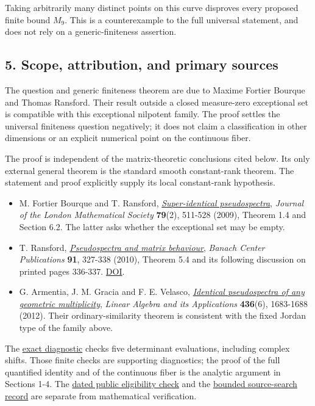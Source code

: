 \documentclass[10pt,a4paper]{article}
\providecommand{\tightlist}{\setlength{\itemsep}{0pt}\setlength{\parskip}{0pt}}
\begin{document}
Taking arbitrarily many distinct points on this curve disproves every
proposed finite bound \(M_9\). This is a counterexample to the full
universal statement, and does not rely on a generic-finiteness
assertion.

\subsection{5. Scope, attribution, and primary
sources}\label{scope-attribution-and-primary-sources}

The question and generic finiteness theorem are due to Maxime Fortier
Bourque and Thomas Ransford. Their result outside a closed measure-zero
exceptional set is compatible with this exceptional nilpotent family.
The proof settles the universal finiteness question negatively; it does
not claim a classification in other dimensions or an explicit numerical
point on the continuous fiber.

The proof is independent of the matrix-theoretic conclusions cited
below. Its only external general theorem is the standard smooth
constant-rank theorem. The statement and proof explicitly supply its
local constant-rank hypothesis.

\begin{itemize}
\tightlist
\item
  M. Fortier Bourque and T. Ransford,
  \href{https://doi.org/10.1112/jlms/jdn085}{\emph{Super-identical
  pseudospectra}}, \emph{Journal of the London Mathematical Society}
  \textbf{79}(2), 511-528 (2009), Theorem 1.4 and Section 6.2. The
  latter asks whether the exceptional set may be empty.
\item
  T. Ransford,
  \href{https://www.impan.pl/shop/en/publication/transaction/download/product/86371}{\emph{Pseudospectra
  and matrix behaviour}}, \emph{Banach Center Publications} \textbf{91},
  327-338 (2010), Theorem 5.4 and its following discussion on printed
  pages 336-337. \href{https://doi.org/10.4064/bc91-0-19}{DOI}.
\item
  G. Armentia, J. M. Gracia and F. E. Velasco,
  \href{https://doi.org/10.1016/j.laa.2011.01.014}{\emph{Identical
  pseudospectra of any geometric multiplicity}}, \emph{Linear Algebra
  and its Applications} \textbf{436}(6), 1683-1688 (2012). Their
  ordinary-similarity theorem is consistent with the fixed Jordan type
  of the family above.
\end{itemize}

The
\href{https://github.com/ajt60gaibb/OpenProblemsInNLA/blob/main/references/stepaniants-sp15-2026-09-12/verification/identity-check.json}{exact
diagnostic} checks five determinant evaluations, including complex
shifts. Those finite checks are supporting diagnostics; the proof of the
full quantified identity and of the continuous fiber is the analytic
argument in Sections 1-4. The
\href{https://github.com/ajt60gaibb/OpenProblemsInNLA/blob/main/references/stepaniants-sp15-2026-09-12/verification/network-check.json}{dated
public eligibility check} and the
\href{https://github.com/ajt60gaibb/OpenProblemsInNLA/blob/main/references/stepaniants-sp15-2026-09-12/verification/eligibility-and-checks.md}{bounded
source-search record} are separate from mathematical verification.
\end{document}
